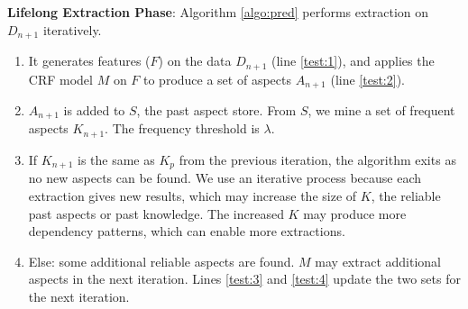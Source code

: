 \documentclass[11pt,a4paper]{article}
\theoremstyle{definition}
\begin{document}
\textbf{Lifelong Extraction Phase}: 
Algorithm \ref{algo:pred} performs extraction on $D_{n+1}$ iteratively. 
\begin{enumerate}
    \item It generates features ($F$) on the data $D_{n+1}$ (line \ref{test:1}), and applies the CRF model $M$ on $F$ to produce a set of aspects $A_{n+1}$ (line \ref{test:2}). 
    \item $A_{n+1}$ is added to $S$, the past aspect store. From $S$, we mine a set of frequent aspects $K_{n+1}$. The frequency threshold is $\lambda$.
    \item If $K_{n+1}$ is the same as $K_p$ from the previous iteration, the algorithm exits as no new aspects can be found. We use an iterative process because each extraction gives new results, which may increase the size of $K$, the reliable past aspects or past knowledge. The increased $K$ may produce more dependency patterns, which can enable more extractions. 
    \item Else: some additional reliable aspects are found. $M$ may extract additional aspects in the next iteration. Lines \ref{test:3} and \ref{test:4} update the two sets for the next iteration.
\end{enumerate}

\end{document}
